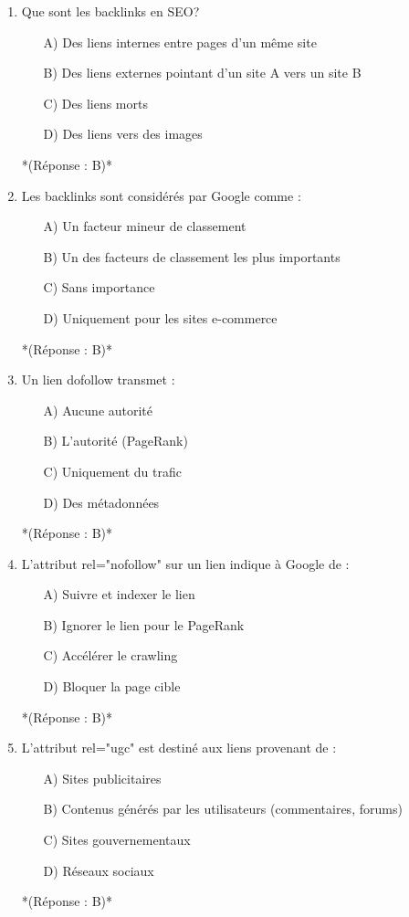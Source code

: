 \documentclass[12pt,a4paper,twoside]{report}
\begin{document}
\begin{enumerate}
\item Que sont les backlinks en SEO?
\begin{itemize}
\item[A)] Des liens internes entre pages d'un même site
\item[B)] Des liens externes pointant d'un site A vers un site B
\item[C)] Des liens morts
\item[D)] Des liens vers des images
\end{itemize}
*(Réponse : B)*

\item Les backlinks sont considérés par Google comme :
\begin{itemize}
\item[A)] Un facteur mineur de classement
\item[B)] Un des facteurs de classement les plus importants
\item[C)] Sans importance
\item[D)] Uniquement pour les sites e-commerce
\end{itemize}
*(Réponse : B)*

\item Un lien dofollow transmet :
\begin{itemize}
\item[A)] Aucune autorité
\item[B)] L'autorité (PageRank)
\item[C)] Uniquement du trafic
\item[D)] Des métadonnées
\end{itemize}
*(Réponse : B)*

\item L'attribut rel="nofollow" sur un lien indique à Google de :
\begin{itemize}
\item[A)] Suivre et indexer le lien
\item[B)] Ignorer le lien pour le PageRank
\item[C)] Accélérer le crawling
\item[D)] Bloquer la page cible
\end{itemize}
*(Réponse : B)*

\item L'attribut rel="ugc" est destiné aux liens provenant de :
\begin{itemize}
\item[A)] Sites publicitaires
\item[B)] Contenus générés par les utilisateurs (commentaires, forums)
\item[C)] Sites gouvernementaux
\item[D)] Réseaux sociaux
\end{itemize}
*(Réponse : B)*


\end{enumerate}
\end{document}
